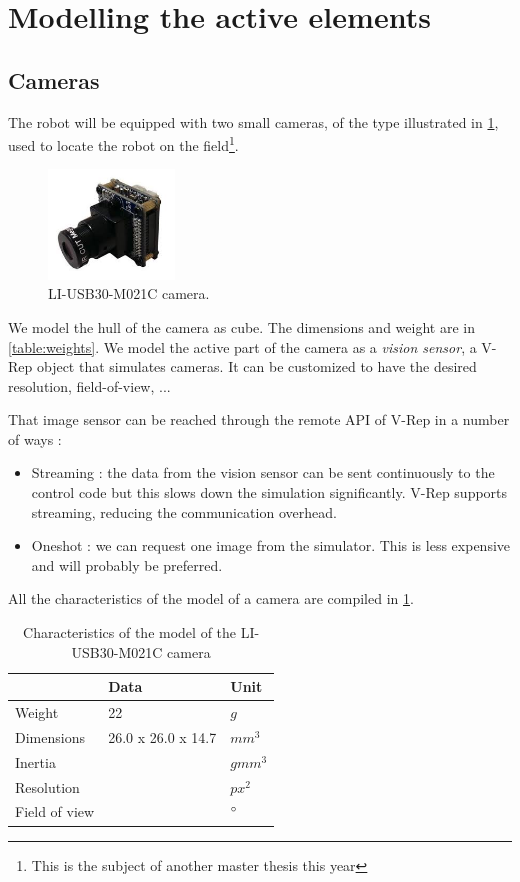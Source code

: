 \section{Modelling the active elements}
\subsection{Cameras}
The robot will be equipped with two small cameras, of the type illustrated in \cref{fig:camera}, used to locate the robot on the field\footnote{This is the subject of another master thesis this year}. 

\begin{figure}[htp]
\center
    \includegraphics[width = 0.3\textwidth]{figures/li_cam}
    \caption{LI-USB30-M021C camera.}
    \label{fig:camera}
\end{figure}

We model the hull of the camera as cube. The dimensions and weight are in \cref{table:weights}. We model the active part of the camera as a \emph{vision sensor}, a V-Rep object that simulates cameras. It can be customized to have the desired resolution, field-of-view, ...

That image sensor can be reached through the remote API of V-Rep in a number of ways : \begin{itemize}
\item Streaming : the data from the vision sensor can be sent continuously to the control code but this slows down the simulation significantly. V-Rep supports streaming, reducing the communication overhead.
\item Oneshot : we can request one image from the simulator. This is less expensive and will probably be preferred.
\end{itemize} 

All the characteristics of the model of a camera are compiled in \cref{table:cam_specs}.

\begin{table}[htp]
\center
\begin{tabularx}{\textwidth}{@{}X X X @{}}
\toprule
 & \textbf{Data} & \textbf{Unit}\\ 
\midrule
Weight & 22 & $g$\\
Dimensions & 26.0 x 26.0 x 14.7 & $mm^3$\\
Inertia & & $gmm^3$\\
Resolution & & $px^2$\\
Field of view & & $\degree$\\
\bottomrule
\end{tabularx}
\caption{Characteristics of the model of the LI-USB30-M021C camera}
\label{table:cam_specs}
\end{table}

